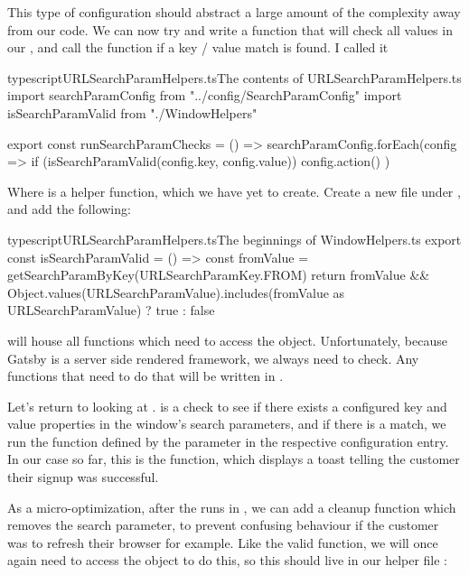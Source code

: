 \documentclass[a4paper,headinclude=on,footinclude=on,12pt,oneside]{scrbook}
\begin{document}
This type of configuration should abstract a large amount of the complexity away from our code. We can now try and write a function that will check all values in our , and call the  function if a key / value match is found. I called it 

\begin{codeInput}{typescript}{URLSearchParamHelpers.ts}{The contents of URLSearchParamHelpers.ts}
import { searchParamConfig } from "../config/SearchParamConfig"
import { isSearchParamValid } from "./WindowHelpers"

export const runSearchParamChecks = () => {
  searchParamConfig.forEach(config => {
    if (isSearchParamValid(config.key, config.value)) {
      config.action()
    }
  })
}  
\end{codeInput}

Where  is a helper function, which we have yet to create. Create a new file  under , and add the following:

\begin{codeInput}{typescript}{URLSearchParamHelpers.ts}{The beginnings of WindowHelpers.ts}
export const isSearchParamValid = () => {
  const fromValue = getSearchParamByKey(URLSearchParamKey.FROM)
  return fromValue && Object.values(URLSearchParamValue).includes(fromValue as URLSearchParamValue) ? true : false
}
\end{codeInput}

 will house all functions which need to access the  object. Unfortunately, because Gatsby is a server side rendered framework, we always need to check. Any functions that need to do that will be written in .

Let's return to looking at .  is a check to see if there exists a configured key and value properties in the window's search parameters, and if there is a match, we run the function defined by the  parameter in the respective configuration entry. In our case so far, this is the  function, which displays a toast telling the customer their signup was successful.


As a micro-optimization, after the  runs in , we can add a cleanup function which removes the search parameter, to prevent confusing behaviour if the customer was to refresh their browser for example. Like the  valid function, we will once again need to access the  object to do this, so this should live in our helper file :
\end{document}
